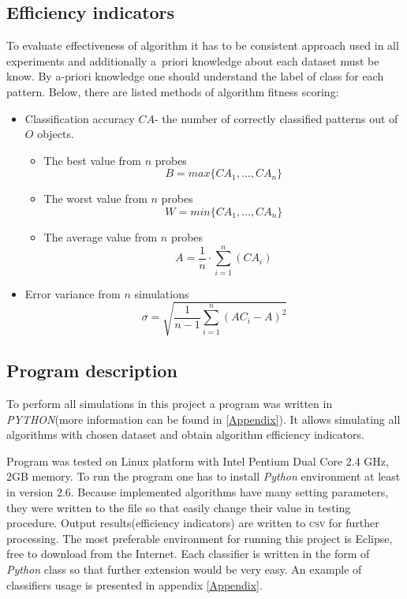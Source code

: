\subsection{Efficiency indicators}
\label{cha:indicators}
To evaluate effectiveness of algorithm it has to be consistent approach used in
all experiments and additionally a~priori knowledge about each dataset must
be know. By a-priori knowledge one should understand the label of class for
each pattern. Below, there are listed methods of algorithm fitness scoring:
\begin{itemize}
	\item Classification accuracy $CA$- the number of correctly classified
        patterns out of $O$ objects.
		\begin{itemize}
			\item The best value from $n$ probes 
				\begin{equation}
                    B=max\{CA_1, \ldots, CA_n\}
					\label{min1}
				\end{equation}
			\item The worst value from $n$ probes 
				\begin{equation}
                    W=min\{CA_1, \ldots, CA_n\}
					\label{min3}
				\end{equation}
			\item The average value from $n$ probes
				\begin{equation}
                    A=\frac{1}{n}\cdot\sum\limits_{i=1}^{n} (CA_i)
					\label{min2}
				\end{equation}
		\end{itemize}
	\item Error variance from $n$ simulations 
		\begin{equation}
            \sigma=\sqrt{\frac{1}{n-1}\sum\limits_{i=1}^n(AC_i-A)^2}
			\label{min4}
		\end{equation}
\end{itemize}
\subsection{Program description}
To perform all simulations in this project a program was written in
\textit{PYTHON}(more information can be found in \ref{Appendix}). 
It allows simulating all algorithms with chosen dataset and obtain
algorithm efficiency indicators. 

Program was tested on Linux platform with Intel Pentium Dual Core 2.4 GHz, 2GB
memory. To run the program one has to install \textit{Python} environment at
least in version 2.6. Because implemented algorithms have many setting parameters, 
they were written to the file so that easily change their value in testing procedure. 
Output results(efficiency indicators) are written to \textsc{csv} for further
processing. The most preferable environment for running this project is
Eclipse, free to download from the Internet. Each classifier is written in the
form of \textit{Python} class so that further extension would be very easy. An
example of classifiers usage is presented in appendix \ref{Appendix}.

